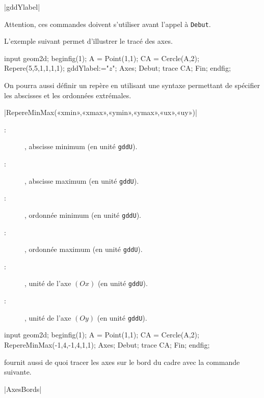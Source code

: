 \documentclass[a4paper,french]{article}
\begin{document}
\begin{colourband}
\macro|gddYlabel|
\end{colourband}

Attention, ces commandes doivent s'utiliser avant l'appel à \lstinline+Debut+.

L'exemple suivant permet d'illustrer le tracé des axes.

\begin{ExempleMP}
input geom2d;
beginfig(1);
A = Point(1,1);
CA = Cercle(A,2);
Repere(5,5,1,1,1,1);
gddYlabel:="$z$";
Axes;
Debut;
trace CA;
Fin;
endfig;
\end{ExempleMP}

On pourra aussi définir un repère en utilisant une syntaxe permettant de
spécifier les abscisses et les ordonnées extrémales.

\begin{colourband}
  \macro|RepereMinMax(«xmin»,«xmax»,«ymin»,«ymax»,«ux»,«uy»)|
  \begin{description}
    \item[:] , abscisse minimum (en unité \lstinline+gddU+).
    \item[:] , abscisse maximum (en unité \lstinline+gddU+).
    \item[:] , ordonnée minimum (en unité \lstinline+gddU+).
    \item[:] , ordonnée maximum (en unité \lstinline+gddU+).
    \item[:] , unité de l'axe $(Ox)$ (en unité \lstinline+gddU+).
    \item[:] , unité de l'axe $(Oy)$ (en unité \lstinline+gddU+).
  \end{description}
\end{colourband}

\begin{ExempleMP}
input geom2d;
beginfig(1);
A = Point(1,1);
CA = Cercle(A,2);
RepereMinMax(-1,4,-1,4,1,1);
Axes;
Debut;
trace CA;
Fin;
endfig;
\end{ExempleMP}

\mpgeomdd fournit aussi de quoi tracer les axes sur le bord du cadre avec la
commande suivante.
\begin{colourband}
\macro|AxesBords|
\end{colourband}
\end{document}
